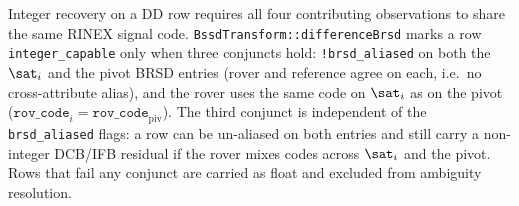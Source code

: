 Integer recovery on a DD row requires all four contributing observations to share
the same RINEX signal code.  \texttt{BssdTransform::differenceBrsd} marks a row
\texttt{integer\_capable} only when three conjuncts hold: \texttt{!brsd\_aliased} on
both the $\sat_i$ and the pivot BRSD entries (rover and reference agree on each, i.e.\
no cross-attribute alias), and the rover uses the same code on $\sat_i$ as on the
pivot ($\texttt{rov\_code}_i = \texttt{rov\_code}_{\text{piv}}$).  The third conjunct
is independent of the \texttt{brsd\_aliased} flags: a row can be un-aliased on both
entries and still carry a non-integer DCB/IFB residual if the rover mixes codes
across $\sat_i$ and the pivot.  Rows that fail any conjunct are carried as float and
excluded from ambiguity resolution.
